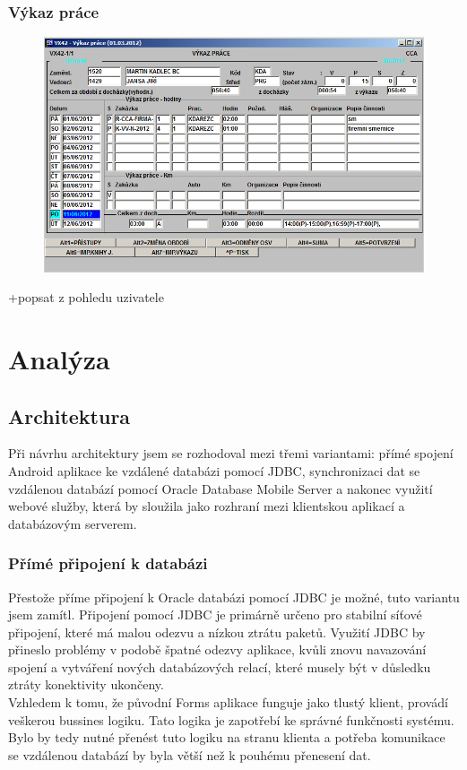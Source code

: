 \documentclass{bakalarka}
\begin{document}
\subsection{Výkaz práce}
\begin{figure}[H]
  \centering
  \includegraphics[scale=0.6]{obr/VX42.png}
  \label{}
\end{figure}
+popsat z pohledu uzivatele

\chapter{Analýza}

\section{Architektura}
Při návrhu architektury jsem se rozhodoval mezi třemi variantami: přímé spojení Android aplikace ke vzdálené databázi pomocí JDBC, synchronizaci dat se vzdálenou databází pomocí Oracle Database Mobile Server a nakonec využití webové služby, která by sloužila jako rozhraní mezi klientskou aplikací a databázovým serverem.

\subsection{Přímé připojení k databázi}
Přestože příme připojení k Oracle databázi pomocí JDBC je možné, tuto variantu jsem zamítl. Připojení pomocí JDBC je primárně určeno pro stabilní síťové připojení, které má malou odezvu a nízkou ztrátu paketů. Využití JDBC by přineslo problémy v podobě špatné odezvy aplikace, kvůli znovu navazování spojení a vytváření nových databázových relací, které musely být v důsledku ztráty konektivity ukončeny.\\ \indent
Vzhledem k tomu, že původní Forms aplikace funguje jako tlustý klient, provádí veškerou bussines logiku. Tato logika je zapotřebí ke správné funkčnosti systému. Bylo by tedy nutné přenést tuto logiku na stranu klienta a potřeba komunikace se vzdálenou databází by byla větší než k pouhému přenesení dat.
\end{document}
